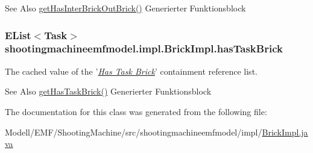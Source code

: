 \begin{DoxySeeAlso}{See Also}
\hyperlink{classshootingmachineemfmodel_1_1impl_1_1_brick_impl_ac5c3b5d60e475bbfdeaae00ca253a7bf}{get\-Has\-Inter\-Brick\-Out\-Brick()} Generierter Funktionsblock  
\end{DoxySeeAlso}
\hypertarget{classshootingmachineemfmodel_1_1impl_1_1_brick_impl_ad74e2edddf418ebc84b4b86103c990f7}{
\subsubsection[{has\-Task\-Brick}]{\setlength{\rightskip}{0pt plus 5cm}E\-List$<${\bf Task}$>$ shootingmachineemfmodel.\-impl.\-Brick\-Impl.\-has\-Task\-Brick\hspace{0.3cm}{\ttfamily [protected]}}}\label{classshootingmachineemfmodel_1_1impl_1_1_brick_impl_ad74e2edddf418ebc84b4b86103c990f7}
The cached value of the '\hyperlink{classshootingmachineemfmodel_1_1impl_1_1_brick_impl_a31e7ecea8f97c7c733ba4ecf8589efc5}{{\itshape Has Task Brick}}' containment reference list.

\begin{DoxySeeAlso}{See Also}
\hyperlink{classshootingmachineemfmodel_1_1impl_1_1_brick_impl_a31e7ecea8f97c7c733ba4ecf8589efc5}{get\-Has\-Task\-Brick()} Generierter Funktionsblock  
\end{DoxySeeAlso}


The documentation for this class was generated from the following file\-:\begin{DoxyCompactItemize}
\item 
Modell/\-E\-M\-F/\-Shooting\-Machine/src/shootingmachineemfmodel/impl/\hyperlink{_brick_impl_8java}{Brick\-Impl.\-java}\end{DoxyCompactItemize}
